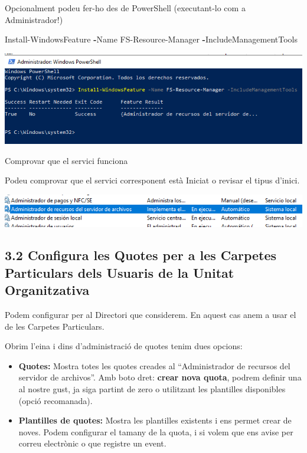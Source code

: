 \documentclass[
  a4paper,
]{article}
\newenvironment{Shaded}{\begin{snugshade}}{\end{snugshade}}
\newcommand{\NormalTok}[1]{#1}
\newcommand{\OperatorTok}[1]{\textcolor[rgb]{0.81,0.36,0.00}{\textbf{#1}}}
\begin{document}
Opcionalment podeu fer-ho des de PowerShell (executant-lo com a
Administrador!)

\begin{Shaded}
\begin{Highlighting}[]
\NormalTok{Install{-}WindowsFeature }\OperatorTok{{-}}\NormalTok{Name FS{-}Resource{-}Manager }\OperatorTok{{-}}\NormalTok{IncludeManagementTools}
\end{Highlighting}
\end{Shaded}

\includegraphics{png/psInstall.png}

Comprovar que el servici funciona

Podeu comprovar que el servici corresponent està Iniciat o revisar el
tipus d'inici.

\includegraphics{png/Servici.png}

\subsection{3.2 Configura les Quotes per a les Carpetes Particulars dels
Usuaris de la Unitat
Organitzativa}\label{configura-les-quotes-per-a-les-carpetes-particulars-dels-usuaris-de-la-unitat-organitzativa}

Podem configurar per al Directori que considerem. En aquest cas anem a
usar el de les Carpetes Particulars.

Obrim l'eina i dins d'administració de quotes tenim dues opcions:

\begin{itemize}
\item
  \textbf{Quotes:} Mostra totes les quotes creades al ``Administrador de
  recursos del servidor de archivos''. Amb boto dret: \textbf{crear nova
  quota}, podrem definir una al nostre gust, ja siga partint de zero o
  utilitzant les plantilles disponibles (opció recomanada).
\item
  \textbf{Plantilles de quotes:} Mostra les plantilles existents i ens
  permet crear de noves. Podem configurar el tamany de la quota, i si
  volem que ens avise per correu electrònic o que registre un event.
\end{itemize}
\end{document}
